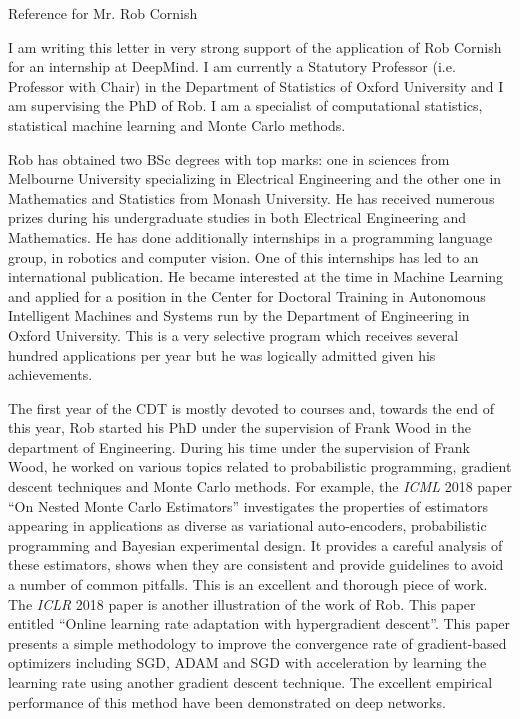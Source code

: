 \documentclass{letter}
\begin{document}
 \bigskip
\bigskip
\begin{letter}{Reference for Mr. Rob Cornish}

\opening{}

\bigskip
\bigskip
I am writing this letter in very strong support of the application of Rob Cornish for an internship at DeepMind.
I am currently a Statutory Professor (i.e. Professor with Chair) in the Department of Statistics of Oxford University and I am supervising the PhD of Rob. I am a specialist of computational statistics, statistical machine learning and Monte Carlo methods.

\bigskip
Rob has obtained two BSc degrees with top marks: one in sciences from Melbourne University specializing in Electrical Engineering and the other one in Mathematics and Statistics from Monash University. He has received numerous prizes during his undergraduate studies in both Electrical Engineering and Mathematics. He has done additionally internships in a programming language group, in robotics and computer vision. One of this internships has led to an international publication. He became interested at the time in Machine Learning and applied for a position in the Center for Doctoral Training in Autonomous Intelligent Machines and Systems run by the Department of Engineering in Oxford University. This is a very selective program which receives several hundred applications per year but he was logically admitted given his achievements.

\bigskip
The first year of the CDT is mostly devoted to courses and, towards the end of this year, Rob started his PhD under the supervision of Frank Wood in the department of Engineering.
During his time under the supervision of Frank Wood, he worked on various topics related to probabilistic programming, gradient descent techniques and Monte Carlo methods. For example, the \emph{ICML} 2018 paper ``On Nested Monte Carlo Estimators'' investigates the properties of estimators appearing in applications as diverse as variational auto-encoders, probabilistic programming and Bayesian experimental design. It provides a careful analysis of these estimators, shows when they are consistent and provide guidelines to avoid a number of common pitfalls. This is an excellent and thorough piece of work. The \emph{ICLR} 2018 paper is another illustration of the work of Rob. This paper entitled ``Online learning rate adaptation with hypergradient descent''. This paper presents a simple methodology to improve the convergence rate of gradient-based optimizers including SGD, ADAM and SGD with acceleration by learning the learning rate using another gradient descent technique. The excellent empirical performance of this method have been demonstrated on deep networks.


\end{letter}
\end{document}
